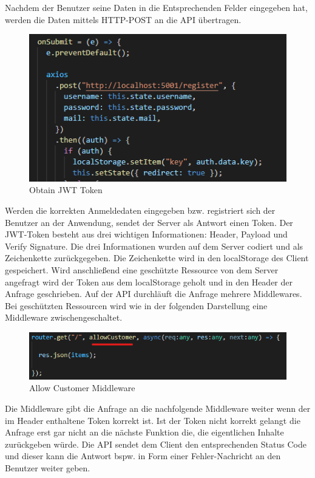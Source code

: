 \documentclass[utf8,biblatex]{lni}
\begin{document}
Nachdem der Benutzer seine Daten in die Entsprechenden Felder eingegeben hat, werden die Daten 
mittels HTTP-POST an die API übertragen.

\begin{figure}
  \centering
  \includegraphics[width=\textwidth]{images/register_obtain_token.png}
  \caption[Obtain JWT Token]{Obtain JWT Token} 
  \label{get-token-from-api}
\end{figure} 

Werden die korrekten Anmeldedaten eingegeben bzw. registriert sich der Benutzer an der 
Anwendung, sendet der Server als Antwort einen Token. 
Der JWT-Token besteht aus drei wichtigen Informationen: Header, Payload und Verify Signature.
Die drei Informationen wurden auf dem Server codiert und als Zeichenkette zurückgegeben. 
Die Zeichenkette wird in den localStorage des Client gespeichert. Wird anschließend eine 
geschützte Ressource von dem Server angefragt wird der Token aus dem localStorage geholt 
und in den Header der Anfrage geschrieben.
Auf der API durchläuft die Anfrage mehrere Middlewares. 
Bei geschützten Ressourcen wird wie in der folgenden Darstellung eine Middleware 
zwischengeschaltet. 

\begin{figure}
  \centering
  \includegraphics[width=\textwidth]{images/allow_customer.png}
  \caption[Allow Customer Middleware]{Allow Customer Middleware} 
  \label{allow-cutomer-middleware}
\end{figure} 

Die Middleware gibt die Anfrage an die nachfolgende Middleware weiter wenn der im Header enthaltene 
Token korrekt ist. Ist der Token nicht korrekt gelangt die Anfrage erst gar nicht an die nächste Funktion die,
die eigentlichen Inhalte zurückgeben würde. 
Die API sendet dem Client den entsprechenden Status Code und dieser kann die Antwort bspw. in Form 
einer Fehler-Nachricht an den Benutzer weiter geben. 
\end{document}
